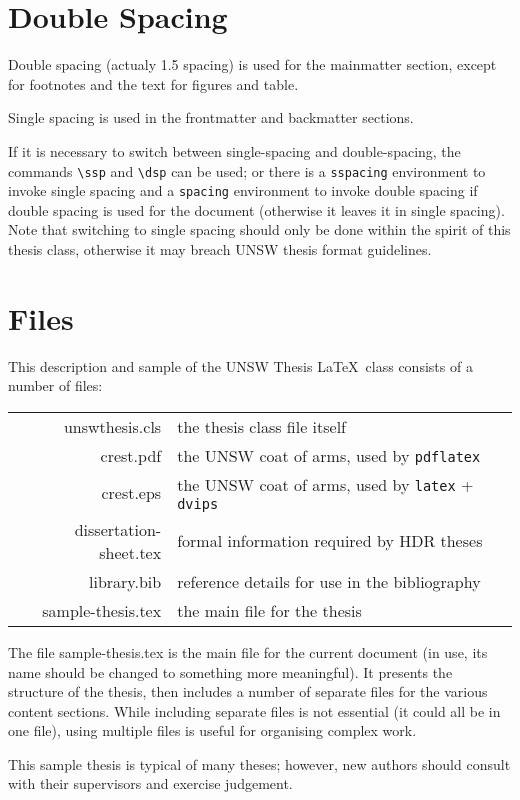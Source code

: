 \section{Double Spacing}
Double spacing (actualy 1.5 spacing) is used for the mainmatter section, except for
footnotes and the text for figures and table.

Single spacing is used in the frontmatter and backmatter sections.

If it is necessary to switch between single-spacing and double-spacing, the commands \verb+\ssp+ and \verb+\dsp+ can be used; or there is a \verb+sspacing+ environment to invoke single spacing and a \verb+spacing+ environment to invoke double spacing if double spacing is used for the document (otherwise it leaves it in single spacing).  Note that switching to single spacing should only be done within the spirit of this thesis class, otherwise it may breach UNSW thesis format guidelines.

\section{Files}

This description and sample of the UNSW Thesis \LaTeX\ class consists of a number of files:

\quad\begin{tabular}{rl}
unswthesis.cls & the thesis class file itself\\[2ex]
crest.pdf & the UNSW coat of arms, used by \verb+pdflatex+ \\
crest.eps & the UNSW coat of arms, used by \verb+latex+ + \verb+dvips+ \\[2ex]
dissertation-sheet.tex & formal information required by HDR theses\\[2ex]
library.bib & reference details for use in the bibliography\\[2ex]
sample-thesis.tex & the main file for the thesis
\end{tabular}

The file sample-thesis.tex is the main file for the current document (in use,
its name should be changed to something more meaningful).  It presents
the structure of the thesis, then includes a number of separate files
for the various content sections.  While including separate files is
not essential (it could all be in one file), using multiple files is
useful for organising complex work.

This sample thesis is typical of many theses; however, new authors should
consult with their supervisors and exercise judgement.

